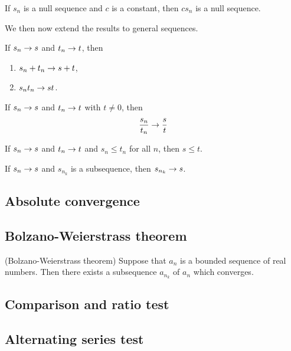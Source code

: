 \documentclass[main.tex]{subfiles}
\begin{document}
	\begin{corollary}
		If $s_n$ is a null sequence and $c$ is a constant, then $cs_n$ is a null sequence.
	\end{corollary}
	We then now extend the results to general sequences.
	\begin{theorem}
		If $s_n \rightarrow s$ and $t_n \rightarrow t$, then
		\begin{enumerate}
			\item $s_n + t_n \rightarrow s + t$,
			\item $s_n t_n \rightarrow st$.
		\end{enumerate}
	\end{theorem}
	
	\begin{theorem}
		If $s_n \rightarrow s$ and $t_n \rightarrow t$ with $t \neq 0$, then
		\begin{equation*}
		\frac{s_n}{t_n} \rightarrow \frac{s}{t}
		\end{equation*}
	\end{theorem}
	
	\begin{theorem}
		If $s_n \rightarrow s$ and $t_n \rightarrow t$ and $s_n \leq t_n$ for all $n$, then $s \leq t$.
	\end{theorem}
	
	\begin{theorem}
		If $s_n \rightarrow s$ and $s_{n_k}$ is a subsequence, then $s_{n_k} \rightarrow s$.
	\end{theorem}
	
	
	
	\subsection{Absolute convergence}
	
	\subsection{Bolzano-Weierstrass theorem}
	\begin{theorem}(Bolzano-Weierstrass theorem)
		Suppose that $a_n$ is a bounded sequence of real numbers. Then there exists a subsequence $a_{n_k}$ of $a_n$ which converges.
	\end{theorem}
	\subsection{Comparison and ratio test}
	
	\subsection{Alternating series test}
	
\end{document}
